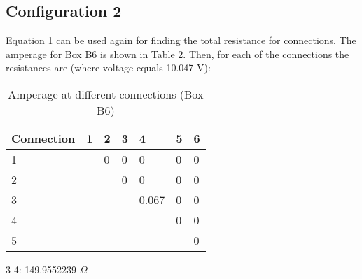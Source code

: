 \documentclass [12pt, letterpaper, twoside] {article}
\begin{document}
\subsection* {Configuration 2}
Equation 1 can be used again for finding the total resistance for connections. The amperage for Box B6 is shown in Table 2. Then, for each of the connections the resistances are (where voltage equals 10.047 V):

\begin {table}
  \centering
  \begin {tabular}{| l | l | l | l | l | l | l |}
    \hline\hline
    Connection & 1 & 2 & 3 & 4 & 5 & 6 \\
    \hline
    1 & & 0 & 0 & 0 & 0 & 0 \\
    \hline
    2 & & & 0 & 0 & 0 & 0 \\
    \hline
    3 & & & & 0.067 & 0 & 0 \\
    \hline
    4 & & & & & 0 & 0 \\
    \hline
    5 & & & & & & 0 \\
    \hline\hline
  \end {tabular}
  \caption {Amperage at different connections (Box B6)}
\end {table}

\vspace{0.5cm}
3-4: 149.9552239 \(\Omega\)
\vspace{0.5cm}
\end{document}
